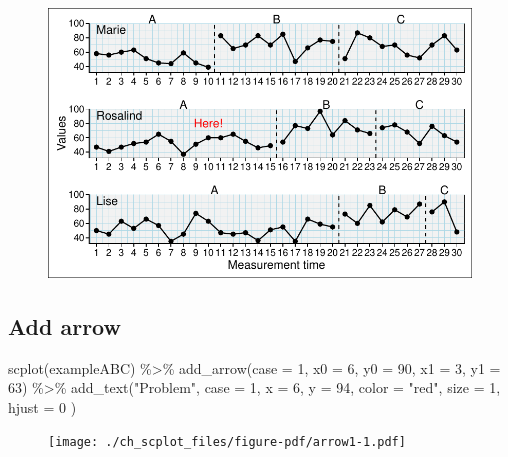 \documentclass[
  letterpaper,
  DIV=11,
  numbers=noendperiod]{scrreprt}
\newenvironment{Shaded}{\begin{snugshade}}{\end{snugshade}}
\newcommand{\AttributeTok}[1]{\textcolor[rgb]{0.40,0.45,0.13}{#1}}
\newcommand{\DecValTok}[1]{\textcolor[rgb]{0.68,0.00,0.00}{#1}}
\newcommand{\FunctionTok}[1]{\textcolor[rgb]{0.28,0.35,0.67}{#1}}
\newcommand{\NormalTok}[1]{\textcolor[rgb]{0.00,0.23,0.31}{#1}}
\newcommand{\SpecialCharTok}[1]{\textcolor[rgb]{0.37,0.37,0.37}{#1}}
\newcommand{\StringTok}[1]{\textcolor[rgb]{0.13,0.47,0.30}{#1}}
\begin{document}
\begin{figure}[H]

{\centering \includegraphics{./ch_scplot_files/figure-pdf/text1-1.pdf}

}

\end{figure}

\hypertarget{add-arrow}{%
\subsection{Add arrow}\label{add-arrow}}

\begin{Shaded}
\begin{Highlighting}[]
\FunctionTok{scplot}\NormalTok{(exampleABC) }\SpecialCharTok{\%\textgreater{}\%}
  \FunctionTok{add\_arrow}\NormalTok{(}\AttributeTok{case =} \DecValTok{1}\NormalTok{, }\AttributeTok{x0 =} \DecValTok{6}\NormalTok{, }\AttributeTok{y0 =} \DecValTok{90}\NormalTok{, }\AttributeTok{x1 =} \DecValTok{3}\NormalTok{, }\AttributeTok{y1 =} \DecValTok{63}\NormalTok{) }\SpecialCharTok{\%\textgreater{}\%}
  \FunctionTok{add\_text}\NormalTok{(}\StringTok{"Problem"}\NormalTok{, }\AttributeTok{case =} \DecValTok{1}\NormalTok{, }\AttributeTok{x =} \DecValTok{6}\NormalTok{, }\AttributeTok{y =} \DecValTok{94}\NormalTok{, }\AttributeTok{color =} \StringTok{"red"}\NormalTok{, }\AttributeTok{size =} \DecValTok{1}\NormalTok{, }\AttributeTok{hjust =} \DecValTok{0}\NormalTok{ ) }
\end{Highlighting}
\end{Shaded}

\begin{figure}[H]

{\centering \texttt{[image: ./ch\_scplot\_files/figure-pdf/arrow1-1.pdf]}

}

\end{figure}
\end{document}
